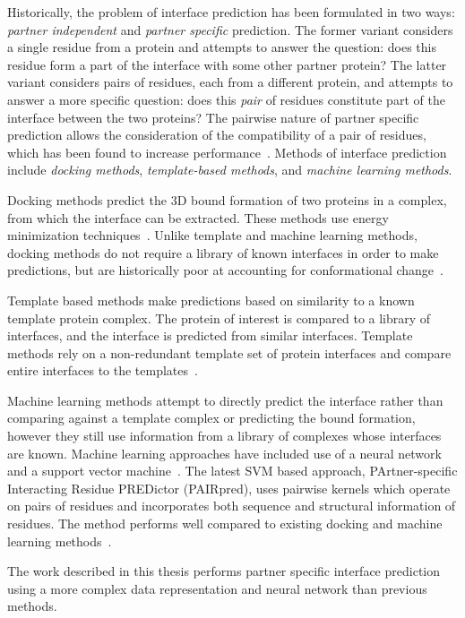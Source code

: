 Historically, the problem of interface prediction has been formulated in two ways: \textit{partner independent} and \textit{partner specific} prediction.
The former variant considers a single residue from a protein and attempts to answer the question: does this residue form a part of the interface with some other partner protein?
The latter variant considers pairs of residues, each from a different protein, and attempts to answer a more specific question: does this \textit{pair} of residues constitute part of the interface between the two proteins?
The pairwise nature of partner specific prediction allows the consideration of the compatibility of a pair of residues, which has been found to increase performance~\cite{ahmad2011}\cite{minhas2014}.
Methods of interface prediction include \textit{docking methods}, \textit{template-based methods}, and \textit{machine learning methods}.

Docking methods predict the 3D bound formation of two proteins in a complex, from which the interface can be extracted. 
These methods use energy minimization techniques~\cite{chen2003}\cite{zundert2016}.
Unlike template and machine learning methods, docking methods do not require a library of known interfaces in order to make predictions, but are historically poor at accounting for conformational change~\cite{ezkurdia2009}.

Template based methods make predictions based on similarity to a known template protein complex.
The protein of interest is compared to a library of interfaces, and the interface is predicted from similar interfaces.
Template methods rely on a non-redundant template set of protein interfaces and compare entire interfaces to the templates~\cite{tuncbag2011}.

Machine learning methods attempt to directly predict the interface rather than comparing against a template complex or predicting the bound formation, however they still use information from a library of complexes whose interfaces are known.
Machine learning approaches have included use of a neural network~\cite{ahmad2011} and a support vector machine~\cite{minhas2014}.
The latest SVM based approach, PArtner-specific Interacting Residue PREDictor (PAIRpred), uses pairwise kernels which operate on pairs of residues and incorporates both sequence and structural information of residues.
The method performs well compared to existing docking and machine learning methods~\cite{minhas2014}.

The work described in this thesis performs partner specific interface prediction using a more complex data representation and neural network than previous methods.